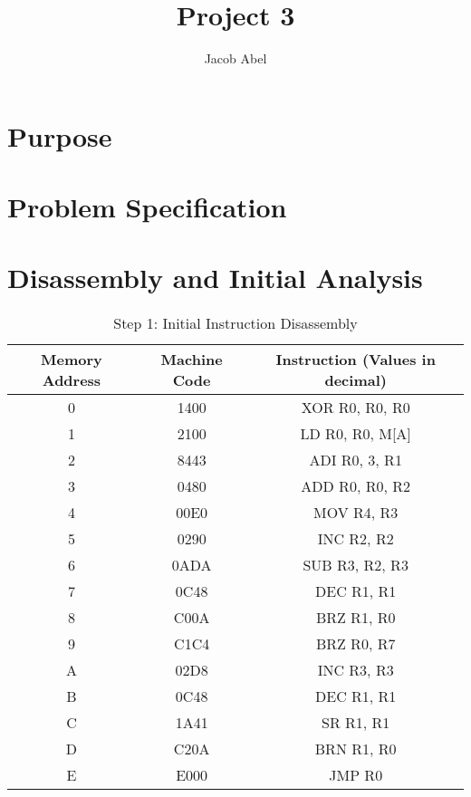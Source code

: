 \documentclass[12pt,letterpaper,titlepage]{article}
\author{Jacob Abel}
\title{Project 3}
\begin{document}
\maketitle


\tableofcontents
\pagebreak
\listoftables

\listoffigures

\pagebreak
\begin{raggedright}

\section{Purpose}


\section{Problem Specification}


\section{Disassembly and Initial Analysis}

\begin{table}[ht]
\centering
\begin{tabular}{|c|c|c|} \hline 
Memory Address & Machine Code & Instruction (Values in decimal) \\ \hline 
0 & 1400 & XOR R0, R0, R0   \\ \hline 
1 & 2100 & LD  R0, R0, M[A] \\ \hline 
2 & 8443 & ADI R0, 3,  R1   \\ \hline 
3 & 0480 & ADD R0, R0, R2   \\ \hline 
4 & 00E0 & MOV R4, R3       \\ \hline 
5 & 0290 & INC R2, R2       \\ \hline 
6 & 0ADA & SUB R3, R2, R3   \\ \hline 
7 & 0C48 & DEC R1, R1       \\ \hline 
8 & C00A & BRZ R1, R0       \\ \hline 
9 & C1C4 & BRZ R0, R7       \\ \hline 
A & 02D8 & INC R3, R3       \\ \hline 
B & 0C48 & DEC R1, R1       \\ \hline 
C & 1A41 & SR  R1, R1       \\ \hline 
D & C20A & BRN R1, R0       \\ \hline 
E & E000 & JMP R0           \\ \hline 
\end{tabular} 
\caption{Step 1: Initial Instruction Disassembly}\label{step1}
\end{table}


\end{raggedright}
\end{document}
